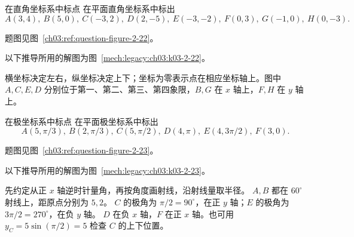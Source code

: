 {\begin{origexamplebox}{在直角坐标系中标点}\label{ch03:ex:k03-2-22}
在平面直角坐标系中标出
\[
A(3,4),\ B(5,0),\ C(-3,2),\ D(2,-5),\ E(-3,-2),\ F(0,3),\ G(-1,0),\ H(0,-3).
\]
\par 题图见图~\ref{ch03:ref:question-figure-2-22}。
\KQuestionAW
\end{origexamplebox}
\begin{xesolution}
以下推导所用的解图为图~\ref{mech:legacy:ch03:k03-2-22}。

横坐标决定左右，纵坐标决定上下；坐标为零表示点在相应坐标轴上。图中 $A,C,E,D$ 分别位于第一、第二、第三、第四象限，$B,G$ 在 $x$ 轴上，$F,H$ 在 $y$ 轴上。
\begin{center}\begin{qualityfigure}
\label{mech:legacy:ch03:k03-2-22}
\end{qualityfigure}\end{center}
\end{xesolution}


\begin{origexamplebox}{在极坐标系中标点}\label{ch03:ex:k03-2-23}
在平面极坐标系中标出
\[
A(5,\pi/3),\ B(2,\pi/3),\ C(5,\pi/2),\ D(4,\pi),\ E(4,3\pi/2),\ F(3,0).
\]
\par 题图见图~\ref{ch03:ref:question-figure-2-23}。
\KQuestionAX
\end{origexamplebox}
\begin{xesolution}
以下推导所用的解图为图~\ref{mech:legacy:ch03:k03-2-23}。

先约定从正 $x$ 轴逆时针量角，再按角度画射线，沿射线量取半径。
$A,B$ 都在 $60^\circ$ 射线上，距原点分别为 $5,2$。
$C$ 的极角为 $\pi/2=90^\circ$，在正 $y$ 轴；$E$ 的极角为 $3\pi/2=270^\circ$，在负 $y$ 轴。
$D$ 在负 $x$ 轴，$F$ 在正 $x$ 轴。也可用 $y_C=5\sin(\pi/2)=5$ 检查 $C$ 的上下位置。
\begin{center}\begin{qualityfigure}
\label{mech:legacy:ch03:k03-2-23}
\end{qualityfigure}\end{center}
\end{xesolution}

}
